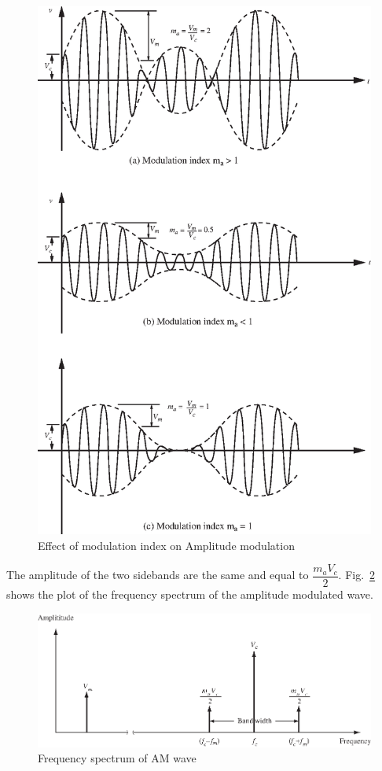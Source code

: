 \begin{figure}[H]
\centering
\includegraphics[scale=.91]{chap9/S3-EE-07-005abc.eps}
\caption{Effect of modulation index on Amplitude modulation}\label{fig9.4}
\end{figure}

The amplitude of the two sidebands are the same and equal to $\dfrac{m_{a}V_{c}}{2}$. Fig.~\ref{fig9.5} shows the plot of the frequency spectrum of the amplitude modulated wave.
\begin{figure}[H]
\centering
\includegraphics{chap9/S3-EE-07-006.eps}
\caption{Frequency spectrum of AM wave}\label{fig9.5}
\end{figure}

